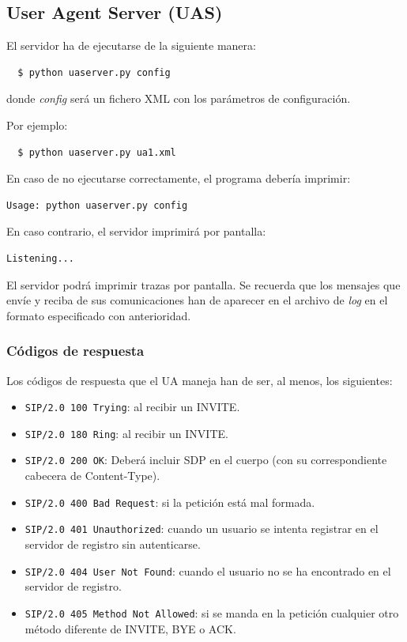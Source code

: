 \documentclass[a4paper,11pt]{article}
\begin{document}
\subsection{User Agent Server (UAS)}

El servidor ha de ejecutarse de la siguiente manera:
\begin{verbatim}
  $ python uaserver.py config
\end{verbatim}

donde \emph{config} será un fichero XML con los parámetros de configuración.

Por ejemplo:
\begin{verbatim}
  $ python uaserver.py ua1.xml
\end{verbatim}

En caso de no ejecutarse correctamente, el programa debería imprimir:
\begin{verbatim}
Usage: python uaserver.py config
\end{verbatim}

En caso contrario, el servidor imprimirá por pantalla:
\begin{verbatim}
Listening...
\end{verbatim}

El servidor podrá imprimir trazas por pantalla. Se recuerda que 
los mensajes que envíe y reciba de sus comunicaciones han de aparecer
en el archivo de \emph{log} en el formato especificado con anterioridad.

\subsubsection{Códigos de respuesta}

Los códigos de respuesta que el UA maneja han de ser, al menos, los siguientes:

   \begin{itemize}
     \item \texttt{SIP/2.0 100 Trying}: al recibir un INVITE.
     \item \texttt{SIP/2.0 180 Ring}: al recibir un INVITE.
     \item \texttt{SIP/2.0 200 OK}: Deberá incluir SDP en el cuerpo (con su correspondiente cabecera de Content-Type).
     \item \texttt{SIP/2.0 400 Bad Request}: si la petición está mal formada.
     \item \texttt{SIP/2.0 401 Unauthorized}: cuando un usuario se intenta registrar en el servidor de registro sin autenticarse.
     \item \texttt{SIP/2.0 404 User Not Found}: cuando el usuario no se ha encontrado en el servidor de registro.
     \item \texttt{SIP/2.0 405 Method Not Allowed}: si se manda en la petición cualquier otro método diferente de INVITE, BYE o ACK.
   \end{itemize}
   
\end{document}
